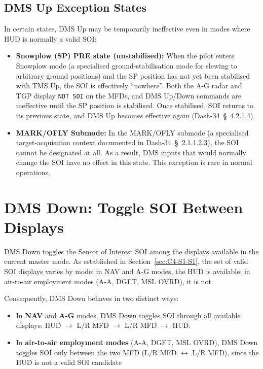 \documentclass[11pt, a4paper, twoside]{report}
\providecommand{\dashref}[1]{Dash-34~\S~#1}
\begin{document}
\subsection{DMS Up Exception States}
\label{sec:C4-S2-S3}

In certain states, DMS Up may be temporarily ineffective even in modes where HUD is normally a valid SOI:

\begin{itemize}
  \item \textbf{Snowplow (SP) PRE state (unstabilised):} When the pilot enters Snowplow mode (a specialised ground-stabilisation mode for slewing to arbitrary ground positions) and the SP position has not yet been stabilised with TMS Up, the SOI is effectively ``nowhere''. Both the A-G radar and TGP display \texttt{NOT SOI} on the MFDs, and DMS Up/Down commands are ineffective until the SP position is stabilised. Once stabilised, SOI returns to its previous state, and DMS Up becomes effective again (\dashref{4.2.1.4}).
  \item \textbf{MARK/OFLY Submode:} In the MARK/OFLY submode (a specialised target-acquisition context documented in \dashref{2.1.1.2.3}), the SOI cannot be designated at all. As a result, DMS inputs that would normally change the SOI have no effect in this state. This exception is rare in normal operations.
\end{itemize}

\section{DMS Down: Toggle SOI Between Displays}
\label{sec:C4-S3}

DMS Down toggles the Sensor of Interest SOI among the displays available in the current master mode. As established in Section~\ref{sec:C4-S1-S1}, the set of valid SOI displays varies by mode: in NAV and A-G modes, the HUD is available; in air-to-air employment modes (A-A, DGFT, MSL OVRD), it is not.

Consequently, DMS Down behaves in two distinct ways:

\begin{itemize}
  \item In \textbf{NAV} and \textbf{A-G} modes, DMS Down toggles SOI through all available displays: HUD $\rightarrow$ L/R MFD $\rightarrow$ L/R MFD $\rightarrow$ HUD.
  \item In \textbf{air-to-air employment modes} (A-A, DGFT, MSL OVRD), DMS Down toggles SOI only between the two MFD (L/R MFD $\leftrightarrow$ L/R MFD), since the HUD is not a valid SOI candidate
\end{itemize}
\end{document}
